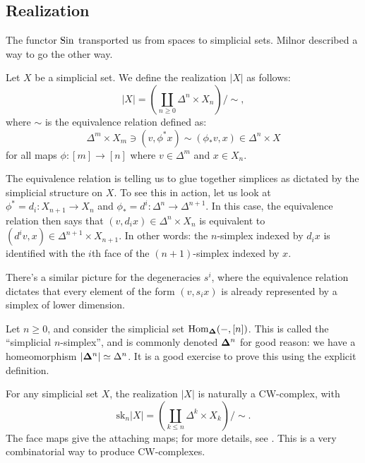 \subsection{Realization}
The functor $\mathrm{Sin}$ transported us from spaces to simplicial sets. Milnor described a way to go the other way. 

Let $X$ be a simplicial set. We define the realization $|X|$ as follows:
$$|X| = \left(\coprod_{n\geq 0}\Delta^n\times X_n\right)/\sim,$$
where $\sim$ is the equivalence relation defined as:
$$
\Delta^m\times X_m\ni (v,\phi^\ast x)\sim (\phi_\ast v, x)\in \Delta^n\times X
$$
for all maps $\phi:[m]\to [n]$ where $v\in \Delta^m$ and $x\in X_n$.
\begin{example}
    The equivalence relation is telling us to glue together simplices as
    dictated by the simplicial structure on $X$. To see this in action, let us
    look at $\phi^\ast = d_i:X_{n+1}\to X_n$ and $\phi_\ast = d^i:\Delta^n\to
    \Delta^{n+1}$. In this case, the equivalence relation then says that
    $(v,d_ix)\in \Delta^n\times X_n$ is equivalent to $(d^i v, x)\in
    \Delta^{n+1}\times X_{n+1}$. In other words: the $n$-simplex indexed by
    $d_i x$ is identified with the $i$th face of the $(n+1)$-simplex indexed by
    $x$.
\end{example}
There's a similar picture for the degeneracies $s^i$, where the equivalence
relation dictates that every element of the form $(v,s_ix)$ is already
represented by a simplex of lower dimension.
\begin{example}
    Let $n\geq 0$, and consider the simplicial set $\operatorname{Hom}_{{\mathbf{\Delta}}}(-,[n])$.
    This is called the ``simplicial $n$-simplex'', and is commonly denoted
    ${\mathbf{\Delta}}^n$ for good reason: we have a homeomorphism $|{\mathbf{\Delta}}^n| \simeq
    \Delta^n$. It is a good exercise to prove this using the explicit
    definition.
\end{example}
For any simplicial set $X$, the realization $|X|$ is naturally a CW-complex,
with
$$\mathrm{sk}_n|X| = \left(\coprod_{k\leq n}\Delta^k\times X_k\right)/\sim.$$
The face maps give the attaching maps; for more details, see \cite[Proposition
I.2.3]{goerss-jardine}. This is a very combinatorial way to produce
CW-complexes.

